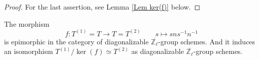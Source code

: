 \begin{proof}
	

    For the last assertion, see Lemma \ref{Lem ker(f)} below.
	
\end{proof}



\begin{lemma}\label{Lem epic}
	The morphism 
	$$f: T^{(1)} = T \longrightarrow T = T^{(2)} \qquad s \longmapsto sns^{-1}n^{-1}$$
	is epimorphic in the category of diagonalizable $\overline{\mathbb{Z}_{\ell}}$-group schemes. And it induces an isomorphism $T^{(1)}/\ker(f) \simeq T^{(2)}$ as diagonalizable $\overline{\mathbb{Z}_{\ell}}$-group schemes.
\end{lemma}

